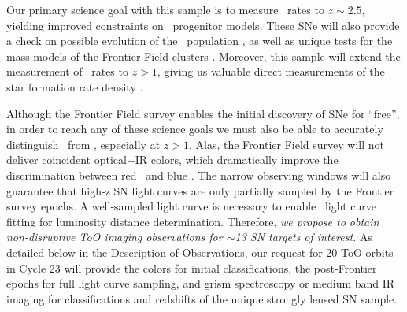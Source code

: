 \documentclass[12pt]{article}
\begin{document}
Our primary science goal with
this sample is to measure \SNIa\ rates to $z\sim2.5$, yielding
improved constraints on \SNIa\ progenitor models.  These SNe will also
provide a check on possible evolution of the \SNIa\
population \citep{Riess:2006}, as well as unique tests for the mass
models of the Frontier Field clusters \citep{Riehm:2011}. Moreover,
this sample will extend the measurement of \CCSN\ rates to $z>1$,
giving us valuable direct measurements of the star formation rate
density \citep{Dahlen:2012}.

\smallskip
{} 
Although the Frontier Field survey enables the initial discovery of
SNe for ``free'', in order to reach any of these science goals we must
also be able to accurately distinguish \SNIa\ from \CCSNe, especially
at $z>1$.  Alas, the Frontier Field survey will not deliver coincident
optical$-$IR colors, which dramatically improve the discrimination
between red \SNeIa\ and blue \CCSNe.  The narrow observing windows
will also guarantee that high-z SN light curves are only partially
sampled by the Frontier survey epochs.  A well-sampled light curve is
necessary to enable
\SNIa\ light curve fitting for luminosity distance determination. 
Therefore, {\it we propose to obtain non-disruptive ToO imaging
observations for $\sim$13 SN targets of interest.}  As detailed below
in the Description of Observations, our request for 20 ToO orbits in
Cycle 23 will provide the colors for initial classifications, the
post-Frontier epochs for full light curve sampling, and grism
spectroscopy or medium band IR
imaging for classifications and redshifts of the unique strongly
lensed SN sample.



%
%
\describeobservations   %


%
%
\specialreq             %


%
%
\coordinatedobs          %
\end{document}
